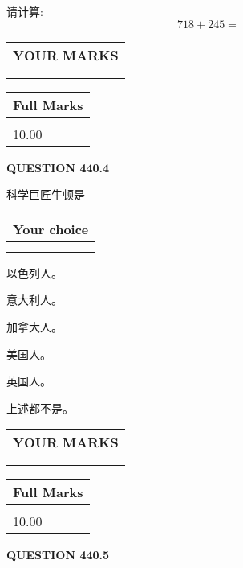 \documentclass{ctexart}
\begin{document}
  
 
请计算:
\begin{equation}
718 +  %
245 = \nonumber
\end{equation}
 

 

 
  
\vspace{0.2in}
  
\noindent\begin{tabular}{|l|}
\hline
 YOUR MARKS  \\
\hline
 \\ 
 \\ 
\hline
\end{tabular}
\hspace{0.05in} \begin{tabular}{|l|}
\hline
 Full Marks  \\
\hline
 \\ 
10.00 \\
\hline
\end{tabular}
{\textbf{\Large{QUESTION
440.4 
}}}
  
  
科学巨匠牛顿是
  
  
\noindent\hspace{3.0in} \begin{tabular}{|l|}
\hline
Your choice \\
\hline
 \\ 
 \\ 
\hline
\end{tabular}
  
  
 
 
以色列人。
 
 
意大利人。
 
 
加拿大人。
 
 
美国人。
 
 
英国人。
 
 
 上述都不是。
 
 
  
\vspace{0.2in}
  
\noindent\begin{tabular}{|l|}
\hline
 YOUR MARKS  \\
\hline
 \\ 
 \\ 
\hline
\end{tabular}
\hspace{0.05in} \begin{tabular}{|l|}
\hline
 Full Marks  \\
\hline
 \\ 
10.00 \\
\hline
\end{tabular}
{\textbf{\Large{QUESTION
440.5 
}}}
  
\end{document}
